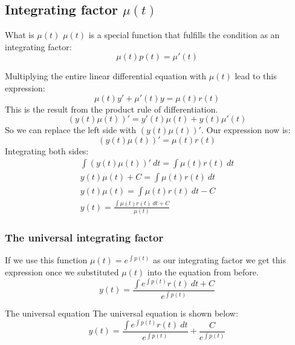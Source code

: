 \documentclass[letterpaper,10pt,twoside,twocolumn,openany]{book}
\begin{document}
\subsection{Integrating factor $\mu(t)$}
\begin{paperbox}{What is $\mu(t)$}
    $ \mu(t) $ is a special function that fulfills the condition as an integrating factor:
    \begin{equation}
        \mu(t) p(t) = \mu'(t)
    \end{equation}
\end{paperbox}
Multiplying the entire linear differential equation with $ \mu(t) $ lead to this expression:
$$
    \mu(t)y' + \mu'(t)y = \mu(t)r(t)
$$
This is the result from the product rule of differentiation.
$$
    (y(t)\mu(t))' = y'(t)\mu(t) + y(t)\mu'(t)
$$
So we can replace the left side with $ (y(t)\mu(t))' $. Our expression now is:
$$
    (y(t)\mu(t))' = \mu(t)r(t)
$$
Integrating both sides:
\begin{gather*}   
    \int (y(t)\mu(t))'\ dt = \int \mu(t)r(t)\ dt\\
    y(t)\mu(t) + C = \int \mu(t)r(t)\ dt\\
    y(t)\mu(t) = \int \mu(t)r(t)\ dt - C\\
    y(t) = \frac{\int \mu(t)r(t)\ dt + C}{\mu(t)}
\end{gather*}

\subsubsection{The universal integrating factor}
If we use this function
$
    \mu(t) = e^{\int p(t)}
$
as our integrating factor we get this expression once we substituted $ \mu(t) $ into the equation from before.\\
\begin{equation*}
    y(t) = \frac{\int e^{\int p(t)} r(t)\ dt + C}{e^{\int p(t)}}
\end{equation*}
\begin{paperbox}{The universal equation}
    The universal equation is shown below:
    \begin{equation}
        y(t) = \frac{\int e^{\int p(t)} r(t)\ dt}{e^{\int p(t)}} + \frac{C}{e^{\int p(t)}}
    \end{equation}
\end{paperbox}
\end{document}

